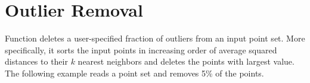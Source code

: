 \section{Outlier Removal}

Function  deletes a user-specified fraction of outliers from an input point set. More specifically, it sorts the input points in increasing order of average squared distances to their $k$ nearest neighbors and deletes the points with largest value. %
  \\




The following example reads a point set and removes 5\% of the points.
